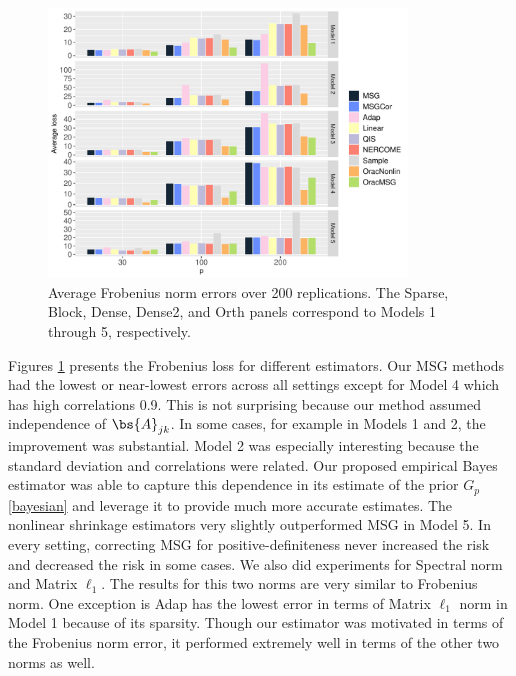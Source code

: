 \begin{figure}
  \centering
  \includegraphics[width=0.85\textwidth]{img/sim2_frobenius.pdf}
  \caption{Average Frobenius norm errors over 200 replications. The Sparse, Block, Dense, Dense2, and Orth panels correspond to Models 1 through 5, respectively.}
  \label{fig:sim2_frobenius}
\end{figure}


Figures \ref{fig:sim2_frobenius} presents the Frobenius loss for different estimators. Our MSG methods had the lowest or near-lowest errors across all settings except for Model 4 which has high correlations 0.9. This is not surprising because our method assumed independence of $\bs{A}_{jk}$.  In some cases, for example in Models 1 and 2, the improvement was substantial. Model 2 was especially interesting because the standard deviation and correlations were related. Our proposed empirical Bayes estimator was able to capture this dependence in its estimate of the prior $G_p$ \eqref{bayesian} and leverage it to provide much more accurate estimates. The nonlinear shrinkage estimators very slightly outperformed MSG in Model 5. In every setting, correcting MSG for positive-definiteness never increased the risk and decreased the risk in some cases. We also did experiments for Spectral norm and Matrix $\ell_1$. The results for this two norms are very similar to Frobenius norm. One exception is Adap has the lowest error in terms of Matrix $\ell_1$ norm in Model 1 because of its sparsity. Though our estimator was motivated in terms of the Frobenius norm error, it performed extremely well in terms of the other two norms as well.

